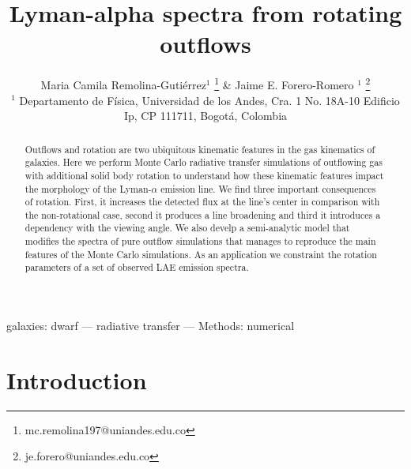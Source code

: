 \documentclass[a4paper,fleqn,usenatbib]{mnras}
\begin{document}
\title[Outflows and rotation in LAEs]{Lyman-alpha spectra from
  rotating outflows}
\author[M.C. Remolina-Gutierrez \& J.E. Forero-Romero]{
  Maria Camila Remolina-Guti\'errez$^{1}$
  \thanks{mc.remolina197@uniandes.edu.co} \&
  Jaime E. Forero-Romero $^{1}$
  \thanks{je.forero@uniandes.edu.co}\\
  $^{1}$ Departamento de F\'isica, Universidad de los Andes, Cra. 1
  No. 18A-10 Edificio Ip, CP 111711, Bogot\'a, Colombia \\
}

\maketitle

\begin{abstract}
Outflows and rotation are two ubiquitous kinematic features in the gas
kinematics of galaxies.
Here we perform Monte Carlo radiative transfer simulations of outflowing
gas with additional solid body rotation to understand how these kinematic
features impact the morphology of the Lyman-$\alpha$ emission line.
We find three important consequences of rotation.
First, it increases the detected flux at the line's center in comparison with the
non-rotational case, second it produces a line broadening and third it introduces
a dependency with the  viewing angle.
We also develp a semi-analytic model that modifies the spectra of
pure outflow simulations that manages to reproduce the main features of the
Monte Carlo simulations.
As an application we constraint the rotation parameters of a set of observed LAE
emission spectra.
\end{abstract}

\begin{keywords}
galaxies: dwarf --- radiative transfer --- Methods: numerical
\end{keywords}




\section{Introduction}
\label{sec:intro}
\end{document}
